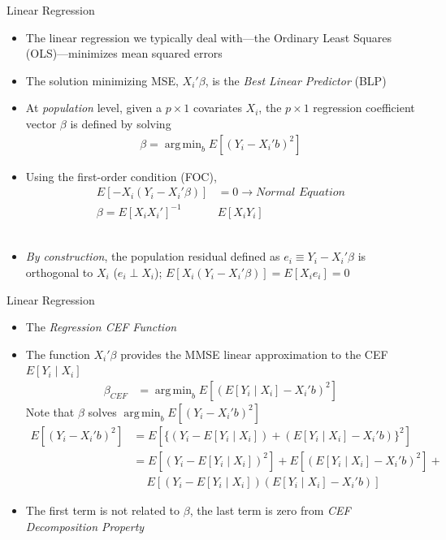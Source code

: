 \documentclass[aspectratio=1610,12pt,xcolor=dvipsnames]{beamer}
\DeclareMathOperator*{\argmin}{arg\,min}
\begin{document}
\begin{frame}{Linear Regression}
    \begin{itemize}
        \item The linear regression we typically deal with—the Ordinary Least Squares (OLS)—minimizes mean squared errors
        \item The solution minimizing MSE, $X_i'\beta$, is the \textit{Best Linear Predictor} (BLP) \pause
        \item At \textit{population} level, given a $p \times 1$ covariates $X_i$, the $p \times 1$ regression coefficient vector $\beta$ is defined by solving
        \begin{align*}
            \beta = \argmin_{b}E[(Y_i - X_i'b)^2]
        \end{align*}
        \item Using the first-order condition (FOC),
        \begin{align*}
            E[-X_i(Y_i - X_i'\beta)] &= 0 \rightarrow \textit{Normal Equation} \\
            \beta = E[X_iX_i']^{-1}&E[X_iY_i]
        \end{align*} \\[-10pt] \pause
        \item \textit{By construction}, the population residual defined as $e_i \equiv Y_i - X_i'\beta$ is orthogonal to $X_i$ ($e_i \perp X_i $); $E[X_i (Y_i - X_i'\beta)] = E[X_i e_i]= 0$
    \end{itemize}
\end{frame}

\begin{frame}{Linear Regression}

\begin{itemize}
    \item The \textit{Regression CEF Function}
    \item The function $X_i'\beta$ provides the MMSE linear approximation to the CEF $E[Y_i \mid X_i]$
    \begin{align*}
        \beta_{CEF} &= \argmin_{b}E[(E[Y_i \mid X_i] - X_i'b)^2] 
    \end{align*}
    Note that $\beta$ solves $\argmin_{b}E[(Y_i - X_i'b)^2]$
    \begin{align*}
        E[(Y_i - X_i'b)^2] &= E[\{ (Y_i - E[Y_i \mid X_i]) + (E[Y_i \mid X_i] - X_i'b) \}^2] \\
         &=  E[(Y_i - E[Y_i \mid X_i])^2] + E[(E[Y_i \mid X_i] - X_i'b)^2] + \\
         & \quad \ E[(Y_i - E[Y_i \mid X_i])(E[Y_i \mid X_i] - X_i'b)]
    \end{align*}
    \item The first term is not related to $\beta$, the last term is zero from \textit{CEF Decomposition Property}
\end{itemize}
\end{frame}
\end{document}
